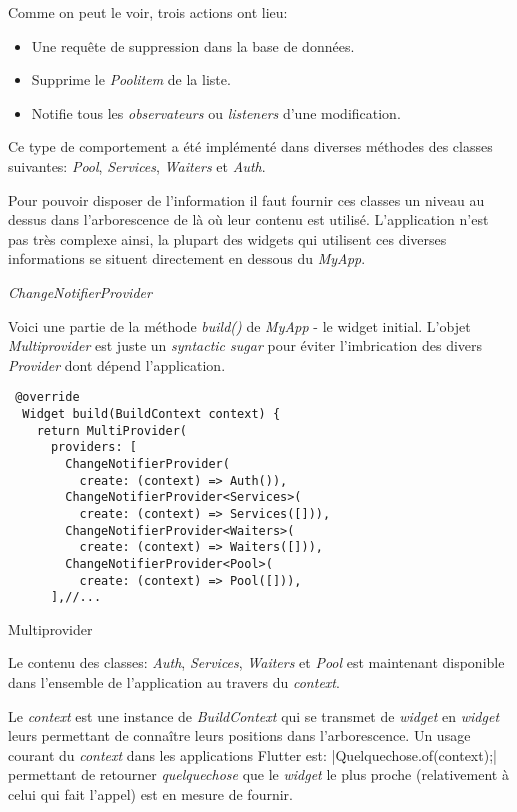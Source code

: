 Comme on peut le voir, trois actions ont lieu:
\smallskip
\begin{itemize}
    \item Une requête de suppression dans la base de données.
    \item Supprime le \textit{Poolitem} de la liste.
    \item Notifie tous les \textit{observateurs} ou \textit{listeners} d'une modification.
\end{itemize}
\smallskip
Ce type de comportement a été implémenté dans diverses méthodes des classes suivantes: \textit{Pool}, \textit{Services}, \textit{Waiters} et \textit{Auth}.

Pour pouvoir disposer de l'information il faut fournir ces classes un niveau au dessus dans l'arborescence de là où leur contenu est utilisé. L'application n'est pas très complexe ainsi, la plupart des widgets qui utilisent ces diverses informations se situent directement en dessous du \textit{MyApp}.

\emph{ChangeNotifierProvider}

Voici une partie de la méthode \textit{build()} de \textit{MyApp} - le widget initial.
L'objet \textit{Multiprovider} est juste un \textit{syntactic sugar} pour éviter l'imbrication des divers \textit{Provider} dont dépend l'application.
\begin{listing}[!h]
\begin{verbatim}
 @override
  Widget build(BuildContext context) {
    return MultiProvider(
      providers: [
        ChangeNotifierProvider(
          create: (context) => Auth()),
        ChangeNotifierProvider<Services>(
          create: (context) => Services([])),
        ChangeNotifierProvider<Waiters>(
          create: (context) => Waiters([])),
        ChangeNotifierProvider<Pool>(
          create: (context) => Pool([])),
      ],//...
\end{verbatim}
\caption{Multiprovider}
\label{code:multiprovider}
\end{listing}

Le contenu des classes: \textit{Auth}, \textit{Services}, \textit{Waiters} et \textit{Pool} est maintenant disponible dans l'ensemble de l'application au travers du \textit{context}.

Le \textit{context} est une instance de \textit{BuildContext} qui se transmet de \textit{widget} en \textit{widget} leurs permettant de connaître leurs positions dans l'arborescence. Un usage courant du \textit{context} dans les applications Flutter est: |Quelquechose.of(context);| permettant de retourner \textit{quelquechose} que le \textit{widget} le plus proche (relativement à celui qui fait l'appel) est en mesure de fournir.

